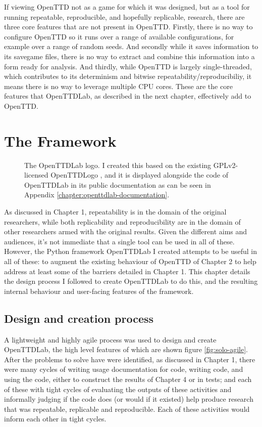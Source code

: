 \documentclass[logo,msc,dsti]{style/infthesis}    %
\begin{document}
{If viewing OpenTTD not as a game for which it was designed, but as a tool for running repeatable, reproducible, and hopefully replicable, research, there are three core features that are not present in OpenTTD. Firstly, there is no way to configure OpenTTD so it runs over a range of available configurations, for example over a range of random seeds. And secondly while it saves information to its savegame files, there is no way to extract and combine this information into a form ready for analysis. And thirdly, while OpenTTD is largely single-threaded, which contributes to its determinism and bitwise repeatability/reproducibiliy, it means there is no way to leverage multiple CPU cores. These are the core features that OpenTTDLab, as described in the next chapter, effectively add to OpenTTD.

\chapter{The Framework}
\label{chapter:openttdlab-design-process-and-features}

\begin{figure}[H]
\centering

\caption{The OpenTTDLab logo. I created this based on the existing GPLv2-licensed OpenTTDLogo \cite{OpenTTDLogo}, and it is displayed alongside the code of OpenTTDLab in its public documentation as can be seen in Appendix \ref{chapter:openttdlab-documentation}.}
\label{fig:openttlab-logo}
\end{figure}

As discussed in Chapter 1, repeatability is in the domain of the original researchers, while both replicability and reproducibility are in the domain of other researchers armed with the original results. Given the different aims and audiences, it's not immediate that a single tool can be used in all of these. However, the Python framework OpenTTDLab I created attempts to be useful in all of these: to augment the existing behaviour of OpenTTD of Chapter 2 to help address at least some of the barriers detailed in Chapter 1. This chapter details the design process I followed to create OpenTTDLab to do this, and the resulting internal behaviour and user-facing features of the framework.

\section{Design and creation process}

A lightweight and highly agile process was used to design and create OpenTTDLab, the high level features of which are shown figure \ref{fig:solo-agile}. After the problems to solve have were identified, as discussed in Chapter 1, there were many cycles of writing usage documentation for code, writing code, and using the code, either to construct the results of Chapter 4 or in tests; and each of these with tight cycles of evaluating the outputs of these activities and informally judging if the code does (or would if it existed) help produce research that was repeatable, replicable and reproducible. Each of these activities would inform each other in tight cycles.

}
\end{document}
